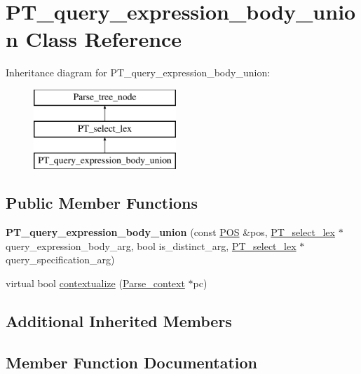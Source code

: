 \hypertarget{classPT__query__expression__body__union}{}\section{P\+T\+\_\+query\+\_\+expression\+\_\+body\+\_\+union Class Reference}
\label{classPT__query__expression__body__union}
Inheritance diagram for P\+T\+\_\+query\+\_\+expression\+\_\+body\+\_\+union\+:\begin{figure}[H]
\begin{center}
\leavevmode
\includegraphics[height=3.000000cm]{classPT__query__expression__body__union}
\end{center}
\end{figure}
\subsection*{Public Member Functions}
\begin{DoxyCompactItemize}
\item 
\mbox{\label{classPT__query__expression__body__union_ac2d38c9940a7b731e61c60ac1b3c9e65}} 
{\bfseries P\+T\+\_\+query\+\_\+expression\+\_\+body\+\_\+union} (const \mbox{\hyperlink{structYYLTYPE}{P\+OS}} \&pos, \mbox{\hyperlink{classPT__select__lex}{P\+T\+\_\+select\+\_\+lex}} $\ast$query\+\_\+expression\+\_\+body\+\_\+arg, bool is\+\_\+distinct\+\_\+arg, \mbox{\hyperlink{classPT__select__lex}{P\+T\+\_\+select\+\_\+lex}} $\ast$query\+\_\+specification\+\_\+arg)
\item 
virtual bool \mbox{\hyperlink{classPT__query__expression__body__union_a380bc05799b66ef388360609f8dbce40}{contextualize}} (\mbox{\hyperlink{structParse__context}{Parse\+\_\+context}} $\ast$pc)
\end{DoxyCompactItemize}
\subsection*{Additional Inherited Members}


\subsection{Member Function Documentation}
\mbox{\label{classPT__query__expression__body__union_a380bc05799b66ef388360609f8dbce40}} 
